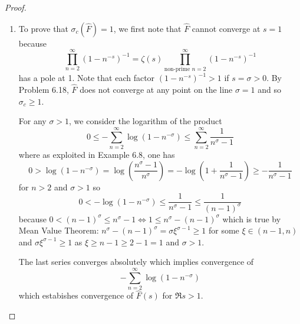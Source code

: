 \documentclass[12pt]{article}
\newcommand{\Fhat}{\widehat{F}}
\begin{document}
\begin{proof}
\begin{enumerate}
\item To prove that $\sigma_c(\Fhat) = 1$, we first note that $\Fhat$ cannot converge at $s = 1$ because
$$\prod_{n = 2}^{\infty} (1 - n^{-s})^{-1} = \zeta(s) \prod_{\text{non-prime } n = 2}^{\infty} (1 - n^{-s})^{-1}$$
has a pole at 1. Note that each factor $(1 - n^{-s})^{-1} > 1$ if $s = \sigma > 0$. By Problem 6.18, $\Fhat$ does not converge at any point on the line $\sigma = 1$ and so $\sigma_c \geq 1$.

For any $\sigma > 1$, we consider the logarithm of the product
$$0 \leq -\sum_{n = 2}^{\infty} \log(1 - n^{-\sigma}) \leq \sum_{n = 2}^{\infty} \frac{1}{n^\sigma - 1}$$
where as exploited in Example 6.8, one has
$$0 > \log(1 - n^{-\sigma}) = \log\left(\frac{n^\sigma - 1}{n^\sigma}\right) = - \log\left(1 + \frac{1}{n^\sigma - 1}\right) \geq -\frac{1}{n^\sigma - 1}$$
for $n > 2$ and $\sigma > 1$ so
$$0 < -\log(1 - n^{-\sigma}) \leq \frac{1}{n^\sigma - 1} \leq \frac{1}{(n-1)^{\sigma}}$$
because $0 < (n-1)^{\sigma} \leq n^\sigma - 1 \iff 1 \leq n^\sigma - (n-1)^\sigma$ which is true by Mean Value Theorem: $n^\sigma - (n-1)^\sigma = \sigma \xi^{\sigma - 1} \geq 1$ for some $\xi \in (n-1, n)$ and $\sigma \xi^{\sigma - 1} \geq 1$ as $\xi \geq n - 1 \geq 2 - 1 = 1$ and $\sigma > 1$.

The last series converges absolutely which implies convergence of
$$-\sum_{n = 2}^{\infty} \log(1 - n^{-\sigma})$$
which estabishes convergence of $\Fhat(s)$ for $\Re s > 1$.
\end{enumerate}
\end{proof}

\unless\ifdefined\IsMainDocument
\end{document}

